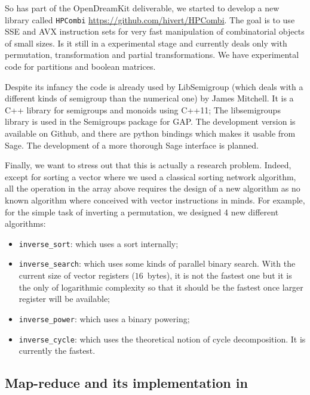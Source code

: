 \documentclass{deliverablereport}
\begin{document}
So has part of the OpenDreamKit deliverable, we started to develop a new
library called \texttt{HPCombi} \url{https://github.com/hivert/HPCombi}. The
goal is to use SSE and AVX instruction sets for very fast manipulation of
combinatorial objects of small sizes. Is it still in a experimental stage and
currently deals only with permutation, transformation and partial
transformations. We have experimental code for partitions and boolean
matrices.

Despite its infancy the code is already used by LibSemigroup
\cite{libsemigroup} (which deals with a different kinds of semigroup than the
numerical one) by James Mitchell. It is a C++ library for semigroups and
monoids using C++11; The libsemigroups library is used in the Semigroups
package for GAP. The development version is available on Github, and there are
python bindings which makes it usable from Sage. The development of a more
thorough Sage interface is planned.

Finally, we want to stress out that this is actually a research
problem. Indeed, except for sorting a vector where we used a classical sorting
network algorithm, all the operation in the array above requires the design of
a new algorithm as no known algorithm where conceived with vector instructions
in minds. For example, for the simple task of inverting a permutation, we
designed 4 new different algorithms:
\begin{itemize}
\item \verb|inverse_sort|: which uses a sort internally;
\item \verb|inverse_search|: which uses some kinds of parallel binary search. With
  the current size of vector registers ($16$~bytes), it is not the fastest one
  but it is the only of logarithmic complexity so that it should be the
  fastest once larger register will be available;
\item \verb|inverse_power|: which uses a binary powering;
\item \verb|inverse_cycle|: which uses the theoretical notion of cycle
  decomposition. It is currently the fastest.
\end{itemize}

\subsection{Map-reduce and its implementation in \Sage}
\label{subsec:map-reduce:Sage}
\end{document}
